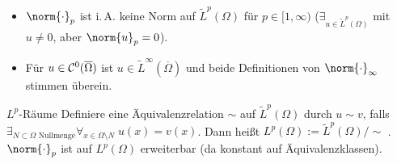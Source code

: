\begin{Bem}
    \begin{itemize}
        \item
        $\norm{\cdot}_p$ ist i.\,A. keine Norm auf $\widetilde{L}^p(\Omega)$ für
        $p \in [1, \infty)$
        ($\exists_{u \in \widetilde{L}^p(\Omega)}$ mit $u \not= 0$, aber $\norm{u}_p = 0$).

        \item
        Für $u \in \mathcal{C}^0(\overline{\Omega})$ ist $u \in \widetilde{L}^\infty(\overline{\Omega})$ und
        beide Definitionen von $\norm{\cdot}_\infty$ stimmen überein.
    \end{itemize}
\end{Bem}

\linie

\begin{Def}{$L^p$-Räume}
    Definiere eine Äquivalenzrelation $\sim$ auf $\widetilde{L}^p(\Omega)$ durch
    $u \sim v$, falls\\
    $\exists_{\text{$N \subset \Omega$ Nullmenge}}
    \forall_{x \in \Omega \setminus N}\; u(x) = v(x)$.
    Dann heißt $L^p(\Omega) := \widetilde{L}^p(\Omega)/\!\sim$ .\\
    $\norm{\cdot}_p$ ist auf $L^p(\Omega)$ erweiterbar (da konstant auf Äquivalenzklassen).
\end{Def}

